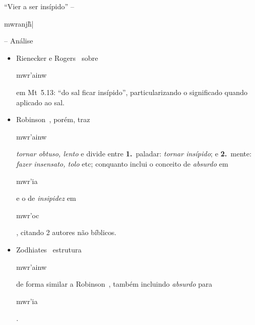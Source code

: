 \documentclass[12pt,aspectratio=169]{beamer}
\newcommand{\YEL}[1]{{\textcolor{TXyel}{#1}}}
\newcommand{\CYA}[1]{{\textcolor{TXcya}{#1}}}
\newcommand{\BRI}[1]{{\textcolor{BSpbg}{#1}}}   %
\newcommand{\GRtxt}[1]{\begin{otherlanguage}{greek}{{#1}}\end{otherlanguage}}
\begin{document}
    \begin{frame}{\BRI{``Vier a ser insípido''} -- \BRI{\GRtxt{mwranj\~h|}} -- \BRI{Análise}}
        \begin{itemize}
            \item<1-> \BRI{Rienecker e Rogers}~\cite{1985-RieneckerF+RogersC-VidaNova} sobre
                \YEL{\GRtxt{mwr'ainw}} em Mt~5.13: \BRI{``do sal ficar insípido''},
                particularizando o significado quando aplicado ao sal.
                \\[\bigskipamount]
            \item<2-> \BRI{Robinson}~\cite{2012-RobinsonE-CPAD}, porém, traz
                \YEL{\GRtxt{mwr'ainw}} \CYA{\textit{tornar obtuso, lento}} e divide entre
                \BRI{\bf 1.}~paladar: \CYA{\textit{tornar insípido}}; e \BRI{\bf 2.}~mente:
                \CYA{\textit{fazer insensato, tolo}} etc; conquanto inclui o conceito de
                \CYA{\textit{absurdo}} em \YEL{\GRtxt{mwr'ia}} e o de \CYA{\textit{insipidez}}
                em \YEL{\GRtxt{mwr'oc}}, citando 2 autores não bíblicos.
                \\[\bigskipamount]
            \item<3-> \BRI{Zodhiates}~\cite{1993-ZodhiatesS+HadjiantoniouG-AMG} estrutura
                \YEL{\GRtxt{mwr'ainw}} de forma similar a
                \BRI{Robinson}~\cite{2012-RobinsonE-CPAD}, também incluindo
                \CYA{\textit{absurdo}} para \YEL{\GRtxt{mwr'ia}}.
                \\[\bigskipamount]
        \end{itemize}
    \end{frame}
\end{document}
